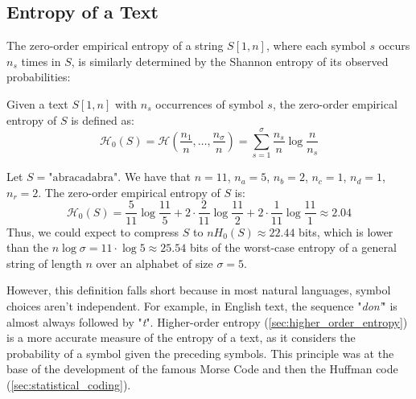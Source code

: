 \subsection{Entropy of a Text}

The zero-order empirical entropy of a string $S[1, n]$, where each symbol $s$ occurs $n_s$ times in $S$, is similarly determined by the Shannon entropy of its observed probabilities:

\begin{definition}
    Given a text $S[1, n]$ with $n_s$ occurrences of symbol $s$, the zero-order empirical entropy of $S$ is defined as:
    \begin{equation}
        \mathcal{H}_0(S) = \mathcal{H} \left( \frac{n_1}{n} , \ldots, \frac{n_{\sigma}}{n} \right) =  \sum_{s=1}^{\sigma} \frac{n_s}{n} \log \frac{n}{n_s}
    \end{equation}
\end{definition}

\begin{example}\label{ex:0_order_entropy_abracadabra}
    Let $S = \text{"abracadabra"}$. We have that $n = 11$, $n_a = 5$, $n_b = 2$, $n_c = 1$, $n_d = 1$, $n_r = 2$. The zero-order empirical entropy of $S$ is:
    \[
        \mathcal{H}_0(S) = \frac{5}{11} \log \frac{11}{5} + 2 \cdot \frac{2}{11} \log \frac{11}{2} + 2 \cdot \frac{1}{11} \log \frac{11}{1} \approx 2.04
    \]
    Thus, we could expect to compress $S$ to $n H_0 (S) \approx 22.44$ bits, which is lower than the $n \log \sigma  = 11 \cdot \log 5 \approx 25.54$ bits of the worst-case entropy of a general string of length $n$ over an alphabet of size $\sigma = 5$.
\end{example}

\noindent However, this definition falls short because in most natural languages, symbol choices aren't independent. For example, in English text, the sequence "\emph{don'}" is almost always followed by "\emph{t}". Higher-order entropy (\autoref{sec:higher_order_entropy}) is a more accurate measure of the entropy of a text, as it considers the probability of a symbol given the preceding symbols. This principle was at the base of the development of the famous Morse Code and then the Huffman code (\autoref{sec:statistical_coding}).
